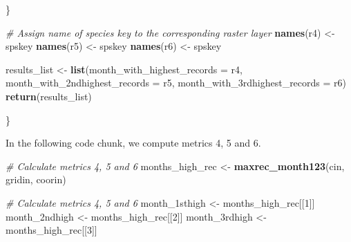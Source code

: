 \documentclass[
]{article}
\newenvironment{Shaded}{\begin{snugshade}}{\end{snugshade}}
\newcommand{\AttributeTok}[1]{\textcolor[rgb]{0.13,0.29,0.53}{#1}}
\newcommand{\CommentTok}[1]{\textcolor[rgb]{0.56,0.35,0.01}{\textit{#1}}}
\newcommand{\DecValTok}[1]{\textcolor[rgb]{0.00,0.00,0.81}{#1}}
\newcommand{\FunctionTok}[1]{\textcolor[rgb]{0.13,0.29,0.53}{\textbf{#1}}}
\newcommand{\NormalTok}[1]{#1}
\newcommand{\OtherTok}[1]{\textcolor[rgb]{0.56,0.35,0.01}{#1}}
\begin{document}
\begin{Shaded}
\begin{Highlighting}[]
\NormalTok{ \}}

  \CommentTok{\# Assign name of species key to the corresponding raster \textquotesingle{}layer\textquotesingle{}}
  \FunctionTok{names}\NormalTok{(r4) }\OtherTok{\textless{}{-}}\NormalTok{ spskey}
  \FunctionTok{names}\NormalTok{(r5) }\OtherTok{\textless{}{-}}\NormalTok{ spskey}
  \FunctionTok{names}\NormalTok{(r6) }\OtherTok{\textless{}{-}}\NormalTok{ spskey}
  
\NormalTok{  results\_list }\OtherTok{\textless{}{-}} \FunctionTok{list}\NormalTok{(}\AttributeTok{month\_with\_highest\_records =}\NormalTok{ r4, }\AttributeTok{month\_with\_2ndhighest\_records =}\NormalTok{ r5, }\AttributeTok{month\_with\_3rdhighest\_records =}\NormalTok{ r6)}
  \FunctionTok{return}\NormalTok{(results\_list)}

\NormalTok{\}}
\end{Highlighting}
\end{Shaded}

In the following code chunk, we compute metrics 4, 5 and 6.

\begin{Shaded}
\begin{Highlighting}[]
\CommentTok{\# Calculate metrics 4, 5 and 6}
\NormalTok{months\_high\_rec }\OtherTok{\textless{}{-}} \FunctionTok{maxrec\_month123}\NormalTok{(cin, gridin, coorin)}
\end{Highlighting}
\end{Shaded}

\begin{Shaded}
\begin{Highlighting}[]
\CommentTok{\# Calculate metrics 4, 5 and 6}
\NormalTok{month\_1sthigh }\OtherTok{\textless{}{-}}\NormalTok{ months\_high\_rec[[}\DecValTok{1}\NormalTok{]]}
\NormalTok{month\_2ndhigh }\OtherTok{\textless{}{-}}\NormalTok{ months\_high\_rec[[}\DecValTok{2}\NormalTok{]]}
\NormalTok{month\_3rdhigh }\OtherTok{\textless{}{-}}\NormalTok{ months\_high\_rec[[}\DecValTok{3}\NormalTok{]]}
\end{Highlighting}
\end{Shaded}
\end{document}
